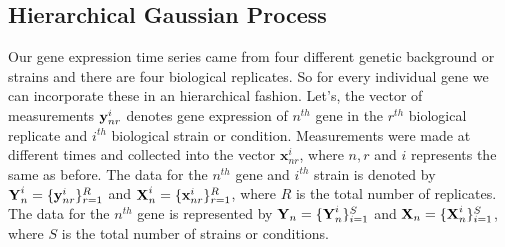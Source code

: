 \subsection{Hierarchical Gaussian Process}
Our gene expression time series came from four different genetic background or strains and there are four biological replicates. So for every individual gene we can incorporate these in an hierarchical fashion. Let's, the vector of measurements ${\textbf y}^{i}_{nr}$ denotes gene expression of $n^{th}$ gene in the $r^{th}$ biological replicate and $i^{th}$ biological strain or condition. Measurements were made at different times and collected into the vector $\textbf{x}^{i}_{nr}$, where $n, r$ and $i$ represents the same as before. The data for the $n^{th}$ gene and $i^{th}$ strain is denoted by ${\textbf Y}^{i}_n = \{{\textbf y}^{i}_{nr}\}^{R}_{r=1}$ and ${\textbf X}^{i}_n = \{{\textbf x}^{i}_{nr}\}^{R}_{r=1}$, where $R$ is the total number of replicates. The data for the $n^{th}$ gene is represented by ${\textbf Y}_n = \{{\textbf Y}^{i}_{n}\}^{S}_{i=1}$ and ${\textbf X}_n = \{{\textbf X}^{i}_{n}\}^{S}_{i=1}$, where $S$ is the total number of strains or conditions.

